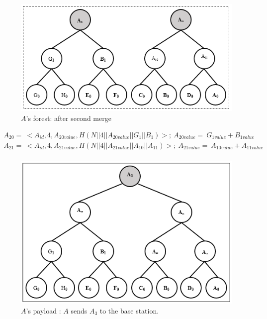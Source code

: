 \documentclass[%
  slidesonly,%
  semlayer%
  ]{seminar}                                  %
\begin{document}
\begin{slide}
      \begin{figure}[h!]
        \centering
        \includegraphics[scale = 0.5]{images/a-forest-second-merge.png}
        \caption{$A$'s forest: after second merge}
        \label{fig:a-forest-second-merge}
      \end{figure}

      \begin{equation*}
        \begin{array}{l}
          A_{20} =\ <A_{id},4,A_{20value},H(N||4||A_{20value}||G_{1}||B_{1})>;\ A_{20value} =\ G_{1value} + B_{1value}\\ 
          A_{21} =\ <A_{id},4,A_{21value},H(N||4||A_{21value}||A_{10}||A_{11})>;\ A_{21value} =\ A_{10value} + A_{11value}\\ 
        \end{array}
      \end{equation*}

      \begin{figure}[h!]
        \centering
        \includegraphics[scale = 0.5]{images/a-payload.png}
        \caption{$A$'s payload : $A$ sends $A_{3}$ to the base station.}
        \label{fig:a-payload}
      \end{figure}


\end{slide}
\end{document}

